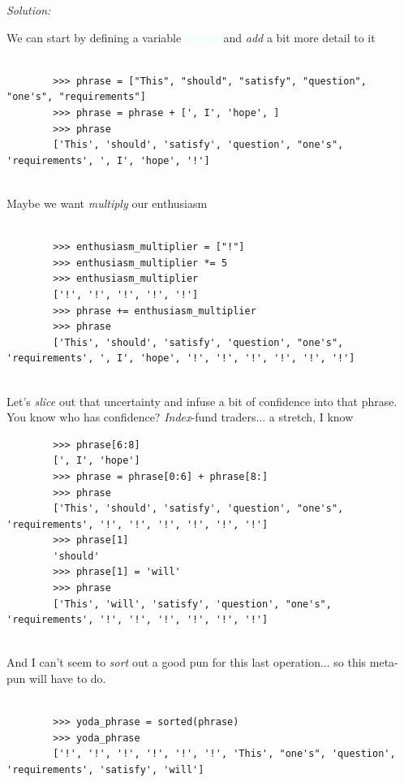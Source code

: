 \documentclass[11pt]{article}
\newenvironment{solution}{
	\vspace{10px}\noindent\emph{Solution:}
}{
	\vspace{10px}
}
\newcommand{\codeword}[1]{
	\texttt{\textcolor{lightCyan}{#1}}
}
\begin{document}
\begin{solution}
	
	We can start by defining a variable \codeword{phrase} and \emph{add} a bit more detail to it
	
	\begin{lstlisting}
	
		>>> phrase = ["This", "should", "satisfy", "question", "one's", "requirements"]
		>>> phrase = phrase + [', I', 'hope', ]
		>>> phrase
        ['This', 'should', 'satisfy', 'question', "one's", 'requirements', ', I', 'hope', '!']
	
	\end{lstlisting}

    Maybe we want \emph{multiply} our enthusiasm 
	
	\begin{lstlisting}
	
		>>> enthusiasm_multiplier = ["!"]
		>>> enthusiasm_multiplier *= 5
		>>> enthusiasm_multiplier
		['!', '!', '!', '!', '!']
		>>> phrase += enthusiasm_multiplier
		>>> phrase
		['This', 'should', 'satisfy', 'question', "one's", 'requirements', ', I', 'hope', '!', '!', '!', '!', '!', '!']
	
	\end{lstlisting}

	Let's \emph{slice} out that uncertainty and infuse a bit of confidence into that phrase. You know who has confidence? \emph{Index}-fund traders... {\tiny a stretch, I know}
	
	\begin{lstlisting}
		>>> phrase[6:8]
		[', I', 'hope']
		>>> phrase = phrase[0:6] + phrase[8:]
		>>> phrase
		['This', 'should', 'satisfy', 'question', "one's", 'requirements', '!', '!', '!', '!', '!', '!']
		>>> phrase[1]
		'should'
		>>> phrase[1] = 'will'
		>>> phrase
		['This', 'will', 'satisfy', 'question', "one's", 'requirements', '!', '!', '!', '!', '!', '!']
	
	\end{lstlisting}
	
	And I can't seem to \emph{sort} out a good pun for this last operation... so this meta-pun will have to do.
	
	\begin{lstlisting}
	
		>>> yoda_phrase = sorted(phrase)
		>>> yoda_phrase
		['!', '!', '!', '!', '!', '!', 'This', "one's", 'question', 'requirements', 'satisfy', 'will']
	
	\end{lstlisting}
	
\end{solution} 
\end{document}
